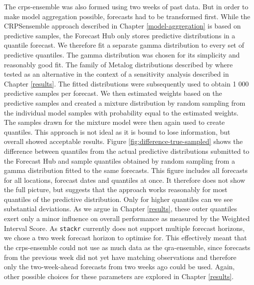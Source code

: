 \documentclass[
]{book}
\begin{document}
The crps-ensemble was also formed using two weeks of past data. But in order to make model aggregation possible, forecasts had to be transformed first. While the CRPSensemble approach described in Chapter \ref{model-aggregation} is based on predictive samples, the Forecast Hub only stores predictive distributions in a quantile forecast. We therefore fit a separate gamma distribution to every set of predictive quantiles. The gamma distribution was chosen for its simplicity and reasonably good fit. The family of Metalog distributions described by \citet{keelinMetalogDistributions2016} where tested as an alternative in the context of a sensitivity analysis described in Chapter \ref{results}. The fitted distributions were subsequently used to obtain 1 000 predictive samples per forecast. We then estimated weights based on the predictive samples and created a mixture distribution by random sampling from the individual model samples with probability equal to the estimated weights. The samples drawn for the mixture model were then again used to create quantiles. This approach is not ideal as it is bound to lose information, but overall showed acceptable results. Figure \ref{fig:difference-true-sampled} shows the difference between quantiles from the actual predictive distributions submitted to the Forecast Hub and sample quantiles obtained by random sampling from a gamma distribution fitted to the same forecasts. This figure includes all forecasts for all locations, forecast dates and quantiles at once. It therefore does not show the full picture, but suggests that the approach works reasonably for most quantiles of the predictive distribution. Only for higher quantiles can we see substantial deviations. As we argue in Chapter \ref{results}, these outer quantiles exert only a minor influence on overall performance as measured by the Weighted Interval Score. As \texttt{stackr} currently does not support multiple forecast horizons, we chose a two week forecast horizon to optimise for. This effectively meant that the crps-ensemble could not use as much data as the qra-ensemble, since forecasts from the previous week did not yet have matching observations and therefore only the two-week-ahead forecasts from two weeks ago could be used. Again, other possible choices for these parameters are explored in Chapter \ref{results}.
\end{document}
